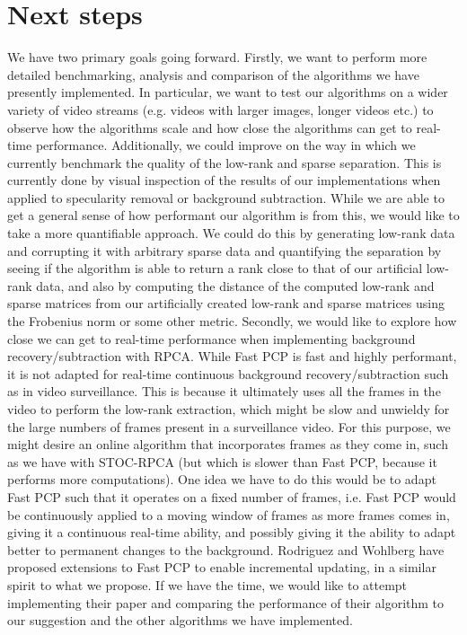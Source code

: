 \documentclass[oneside]{article}
\begin{document}
\section{Next steps}
We have two primary goals going forward. Firstly, we want to perform more detailed benchmarking, analysis and comparison of the algorithms we have presently implemented. In particular, we want to test our algorithms on a wider variety of video streams (e.g. videos with larger images, longer videos etc.) to observe how the algorithms scale and how close the algorithms can get to real-time performance. Additionally, we could improve on the way in which we currently benchmark the quality of the low-rank and sparse separation. This is currently done by visual inspection of the results of our implementations when applied to specularity removal or background subtraction. While we are able to get a general sense of how performant our algorithm is from this, we would like to take a more quantifiable approach. We could do this by generating low-rank data and corrupting it with arbitrary sparse data and quantifying the separation by seeing if the algorithm is able to return a rank close to that of our artificial low-rank data, and also by computing the distance of the computed low-rank and sparse matrices from our artificially created low-rank and sparse matrices using the Frobenius norm or some other metric.\newline\newline
Secondly, we would like to explore how close we can get to real-time performance when implementing background recovery/subtraction with RPCA. While Fast PCP is fast and highly performant, it is not adapted for real-time continuous background recovery/subtraction such as in video surveillance. This is because it ultimately uses all the frames in the video to perform the low-rank extraction, which might be slow and unwieldy for the large numbers of frames present in a surveillance video. For this purpose, we might desire an online algorithm that incorporates frames as they come in, such as we have with STOC-RPCA (but which is slower than Fast PCP, because it performs more computations). One idea we have to do this would be to adapt Fast PCP such that it operates on a fixed number of frames, i.e. Fast PCP would be continuously applied to a moving window of frames as more frames comes in, giving it a continuous real-time ability, and possibly giving it the ability to adapt better to permanent changes to the background. Rodriguez and Wohlberg have proposed extensions to Fast PCP to enable incremental updating, in a similar spirit to what we propose. If we have the time, we would like to attempt implementing their paper and comparing the performance of their algorithm to our suggestion and the other algorithms we have implemented.
\end{document}
